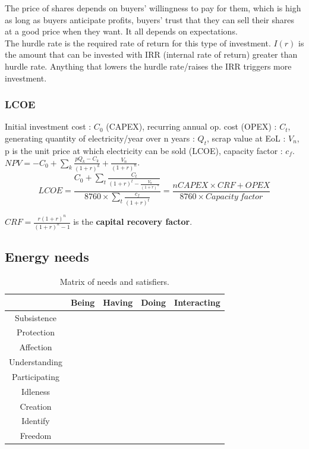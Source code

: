 \documentclass[../main.tex]{subfiles}
\begin{document}
The price of shares depends on buyers' willingness to pay for them, which is high as long as buyers anticipate profits, buyers' trust that they can sell their shares at a good price when they want. \warning It all depends on expectations. \\
The hurdle rate is the required rate of return for this type of investment. $I(r)$ is the amount that can be invested with IRR (internal rate of return) greater than hurdle rate. Anything that lowers the hurdle rate/raises the IRR triggers more investment. \\

\subsubsection{LCOE}
Initial investment cost : $C_0$ (CAPEX), recurring annual op. cost (OPEX) : $C_t$, generating quantity of electricity/year over n years : $Q_t$, scrap value at EoL : $V_n$, p is the unit price at which electricity can be sold (LCOE), capacity factor : $c_f$. \\
$NPV = -C_0 + \sum_k \frac{pQ_k-C_k}{(1+r)^k} + \frac{V_n}{(1+r)^n}$. \begin{equation}
    LCOE = \frac{C_0 + \sum_t \frac{C_t}{(1+r)^t - \frac{V_n}{(1+r)^n}}}{8760\times \sum_t \frac{c_f}{(1+r)^t}} = \frac{n CAPEX\times CRF+OPEX}{8760 \times Capacity\: factor}
\end{equation}

$CRF = \frac{r(1+r)^n}{(1+r)^n-1}$ is the \textbf{capital recovery factor}.

\subsection{Energy needs}

\begin{table}[hbt!]
    \centering
    \begin{tabular}{c|c|c|c|c}
         & Being & Having & Doing & Interacting \\ \hline
       Subsistence  & &&&\\
       Protection &&&&\\
       Affection &&&&\\
       Understanding &&&&\\
       Participating &&&&\\
       Idleness &&&&\\
       Creation &&&&\\
       Identify &&&&\\
       Freedom &&&&\\
    \end{tabular}
    \caption{Matrix of needs and satisfiers.}
\end{table}
\end{document}
